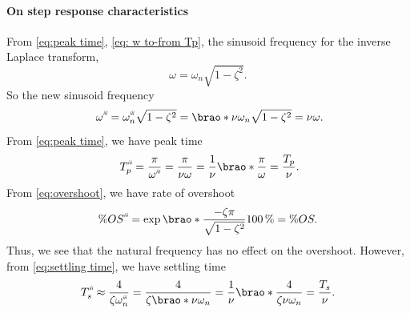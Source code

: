 \documentclass[12pt]{article}
\DeclarePairedDelimiter\brao()%
\newcommand{\setprime}[2][1]{%
    {#2}^{%
        \raisebox{1pt}{%
            \scalebox{0.5}{%
                \itshape\sffamily\uppercase%
                \expandafter{%
                    \romannumeral#1%
                }%
            }%
        }
    }%
}%
\begin{document}
\begin{enumerate}[(a)]
        \paragraph{On step response characteristics}
        From \eqref{eq:peak time}, \eqref{eq: w to-from Tp},
        the sinusoid frequency for the inverse Laplace transform,
        \begin{equation}
              \omega = \omega_n\sqrt{1 - \zeta^2}.
        \end{equation}
        So the new sinusoid frequency
        \begin{equation}
              \setprime[3]\omega
            = \setprime[3]\omega_n\sqrt{1 - \zeta^2}
            = \brao*{\nu\omega_n}\sqrt{1 - \zeta^2}
            = \nu\omega\rlap.
        \end{equation}
        From \eqref{eq:peak time}, we have peak time
        \begin{equation}
              \setprime[3]T_p
            = \frac\pi{\setprime[3]\omega}
            = \frac\pi{\nu\omega}
            = \frac1\nu\brao*{\frac\pi\omega}
            = \frac{T_p}\nu\rlap.
        \end{equation}
        From \eqref{eq:overshoot}, we have rate of overshoot
        \begin{equation}
              \%\setprime[3]{OS}
            = \exp\brao*{\frac{-\zeta\pi}{\sqrt{1 - \zeta^2}}} \SI{100}\percent
            = \%OS.
        \end{equation}
        Thus, we see that the natural frequency has no effect on the overshoot.
        However, from \eqref{eq:settling time}, we have settling time
        \begin{equation}
                    \setprime[3]T_s
            \approx \frac4{\zeta\setprime[3]\omega_n}
                  = \frac4{\zeta\brao*{\nu\omega_n}}
                  = \frac1\nu \brao*{\frac4{\zeta\nu\omega_n}}
                  = \frac{T_s}\nu.
        \end{equation}


\end{enumerate}
\end{document}
